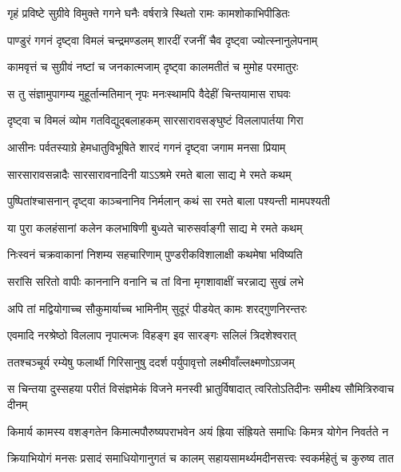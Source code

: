 
\twolineshloka
{गृहं प्रविष्टे सुग्रीवे विमुक्ते गगने घनैः}
{वर्षरात्रे स्थितो रामः कामशोकाभिपीडितः} %

\twolineshloka
{पाण्डुरं गगनं दृष्ट्वा विमलं चन्द्रमण्डलम्}
{शारदीं रजनीं चैव दृष्ट्वा ज्योत्स्नानुलेपनाम्} %

\twolineshloka
{कामवृत्तं च सुग्रीवं नष्टां च जनकात्मजाम्}
{दृष्ट्वा कालमतीतं च मुमोह परमातुरः} %

\twolineshloka
{स तु संज्ञामुपागम्य मुहूर्तान्मतिमान् नृपः}
{मनःस्थामपि वैदेहीं चिन्तयामास राघवः} %

\twolineshloka
{दृष्ट्वा च विमलं व्योम गतविद्युद्बलाहकम्}
{सारसारावसङ्घुष्टं विललापार्तया गिरा} %

\twolineshloka
{आसीनः पर्वतस्याग्रे हेमधातुविभूषिते}
{शारदं गगनं दृष्ट्वा जगाम मनसा प्रियाम्} %

\twolineshloka
{सारसारावसन्नादैः सारसारावनादिनी}
{याऽऽश्रमे रमते बाला साद्य मे रमते कथम्} %

\twolineshloka
{पुष्पितांश्चासनान् दृष्ट्वा काञ्चनानिव निर्मलान्}
{कथं सा रमते बाला पश्यन्ती मामपश्यती} %

\twolineshloka
{या पुरा कलहंसानां कलेन कलभाषिणी}
{बुध्यते चारुसर्वाङ्गी साद्य मे रमते कथम्} %

\twolineshloka
{निःस्वनं चक्रवाकानां निशम्य सहचारिणाम्}
{पुण्डरीकविशालाक्षी कथमेषा भविष्यति} %

\twolineshloka
{सरांसि सरितो वापीः काननानि वनानि च}
{तां विना मृगशावाक्षीं चरन्नाद्य सुखं लभे} %

\twolineshloka
{अपि तां मद्वियोगाच्च सौकुमार्याच्च भामिनीम्}
{सुदूरं पीडयेत् कामः शरद्गुणनिरन्तरः} %

\twolineshloka
{एवमादि नरश्रेष्ठो विललाप नृपात्मजः}
{विहङ्ग इव सारङ्गः सलिलं त्रिदशेश्वरात्} %

\twolineshloka
{ततश्चञ्चूर्य रम्येषु फलार्थी गिरिसानुषु}
{ददर्श पर्युपावृत्तो लक्ष्मीवाँल्लक्ष्मणोऽग्रजम्} %

\twolineshloka
{स चिन्तया दुस्सहया परीतं विसंज्ञमेकं विजने मनस्वी}
{भ्रातुर्विषादात् त्वरितोऽतिदीनः समीक्ष्य सौमित्रिरुवाच दीनम्} %

\twolineshloka
{किमार्य कामस्य वशङ्गतेन किमात्मपौरुष्यपराभवेन}
{अयं ह्रिया संह्रियते समाधिः किमत्र योगेन निवर्तते न} %

\twolineshloka
{क्रियाभियोगं मनसः प्रसादं समाधियोगानुगतं च कालम्}
{सहायसामर्थ्यमदीनसत्त्वः स्वकर्महेतुं च कुरुष्व तात} %

